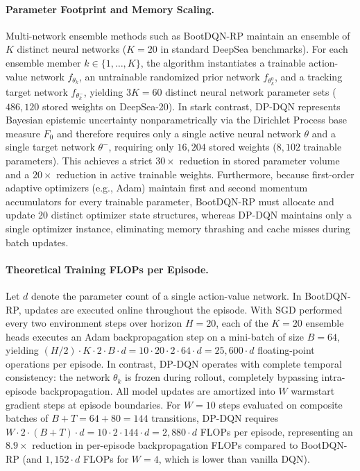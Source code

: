 \documentclass[10pt]{article}
\begin{document}
\paragraph{Parameter Footprint and Memory Scaling.}
Multi-network ensemble methods such as BootDQN-RP maintain an ensemble of $K$ distinct neural networks ($K=20$ in standard DeepSea benchmarks). For each ensemble member $k \in \{1, \dots, K\}$, the algorithm instantiates a trainable action-value network $f_{\theta_k}$, an untrainable randomized prior network $f_{\theta_k^0}$, and a tracking target network $f_{\theta_k^-}$, yielding $3K = 60$ distinct neural network parameter sets ($486{,}120$ stored weights on DeepSea-20). In stark contrast, DP-DQN represents Bayesian epistemic uncertainty nonparametrically via the Dirichlet Process base measure $F_0$ and therefore requires only a single active neural network $\theta$ and a single target network $\theta^-$, requiring only $16{,}204$ stored weights ($8{,}102$ trainable parameters). This achieves a strict $30\times$ reduction in stored parameter volume and a $20\times$ reduction in active trainable weights. Furthermore, because first-order adaptive optimizers (e.g., Adam) maintain first and second momentum accumulators for every trainable parameter, BootDQN-RP must allocate and update 20 distinct optimizer state structures, whereas DP-DQN maintains only a single optimizer instance, eliminating memory thrashing and cache misses during batch updates.

\paragraph{Theoretical Training FLOPs per Episode.}
Let $d$ denote the parameter count of a single action-value network. In BootDQN-RP, updates are executed online throughout the episode. With SGD performed every two environment steps over horizon $H=20$, each of the $K=20$ ensemble heads executes an Adam backpropagation step on a mini-batch of size $B=64$, yielding $(H / 2) \cdot K \cdot 2 \cdot B \cdot d = 10 \cdot 20 \cdot 2 \cdot 64 \cdot d = 25{,}600 \cdot d$ floating-point operations per episode. In contrast, DP-DQN operates with complete temporal consistency: the network $\theta_k$ is frozen during rollout, completely bypassing intra-episode backpropagation. All model updates are amortized into $W$ warmstart gradient steps at episode boundaries. For $W=10$ steps evaluated on composite batches of $B + T = 64 + 80 = 144$ transitions, DP-DQN requires $W \cdot 2 \cdot (B + T) \cdot d = 10 \cdot 2 \cdot 144 \cdot d = 2{,}880 \cdot d$ FLOPs per episode, representing an $8.9\times$ reduction in per-episode backpropagation FLOPs compared to BootDQN-RP (and $1{,}152 \cdot d$ FLOPs for $W=4$, which is lower than vanilla DQN).
\end{document}
